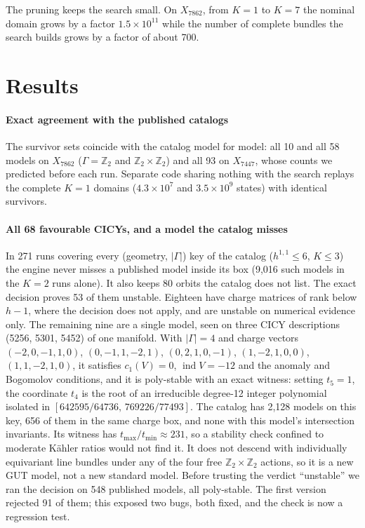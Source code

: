 \documentclass[10pt,a4paper]{article}
\newcommand{\Z}{\mathbb{Z}}
\newcommand{\ind}{\operatorname{ind}}
\newcommand{\Xa}{X_{7862}}
\newcommand{\Xb}{X_{7447}}
\begin{document}
\smallskip
The pruning keeps the search small. On $\Xa$, from $K=1$ to $K=7$ the nominal
domain grows by a factor $1.5\times10^{11}$ while the number of complete
bundles the search builds grows by a factor of about 700.

\section{Results}

\paragraph{Exact agreement with the published catalogs} The survivor sets
coincide with the catalog model for model: all 10 and all 58 models on $\Xa$
($\Gamma=\Z_2$ and $\Z_2\times\Z_2$) and all 93 on $\Xb$, whose counts we
predicted before each run. Separate code sharing nothing with the search
replays the complete $K=1$ domains ($4.3\times10^7$ and $3.5\times10^9$ states)
with identical survivors.

\paragraph{All 68 favourable CICYs, and a model the catalog misses} In 271
runs covering every (geometry, $|\Gamma|$) key of the catalog
($h^{1,1}\le6$, $K\le3$) the engine never misses a published model inside its
box (9,016 such models in the $K=2$ runs alone). It also keeps 80 orbits the catalog
does not list. The exact decision proves 53 of them unstable. Eighteen have
charge matrices of rank below $h-1$, where the decision does not apply, and are
unstable on numerical evidence only. The remaining nine are a single model,
seen on three CICY descriptions (5256, 5301, 5452) of one manifold. With
$|\Gamma|=4$ and charge vectors
$(-2,0,-1,1,0)$, $(0,-1,1,-2,1)$, $(0,2,1,0,-1)$, $(1,-2,1,0,0)$, $(1,1,-2,1,0)$,
it satisfies $c_1(V)=0$, $\ind V=-12$ and the anomaly and Bogomolov conditions,
and it is poly-stable with an exact witness: setting $t_5=1$, the coordinate
$t_4$ is the root of an irreducible degree-12 integer polynomial isolated in
$[642595/64736,\,769226/77493]$. The catalog has 2,128 models on this key, 656
of them in the same charge box, and none with this model's intersection
invariants. Its witness has $t_{\max}/t_{\min}\approx231$, so a stability check
confined to moderate Kähler ratios would not find it. It does not descend with
individually equivariant line bundles under any of the four free
$\Z_2\times\Z_2$ actions, so it is a new GUT model, not a new standard model.
Before trusting the verdict ``unstable'' we ran the decision on 548 published
models, all poly-stable. The first version rejected 91 of them; this exposed
two bugs, both fixed, and the check is now a regression test.
\end{document}
